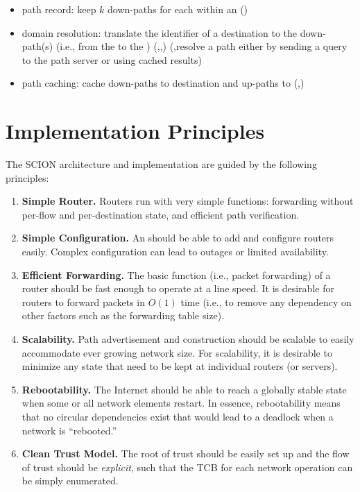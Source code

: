 \begin{itemize}
\item path record: keep $k$ down-paths for each \AD within an \ISD (\TAD)
\item domain resolution: translate the identifier of a destination \AD to the down-path(s) (i.e., from the \ISDC to the \AD) (\CAD,\TAD,\EAD) (\TAD,\EAD resolve a path either by sending a query to the \ISDC path server or using cached results) 
\item path caching: cache down-paths to destination \ADs and up-paths to \ISDC (\TAD,\EAD)
\end{itemize}


\section{Implementation Principles}
The SCION architecture and implementation are guided by the following principles:

\begin{enumerate}
\item {\bf Simple Router. }
Routers run with very simple functions: forwarding without per-flow and per-destination state, and efficient path verification.


\item {\bf Simple Configuration. }
An \AD should be able to add and configure routers easily. Complex configuration
can lead to outages or limited availability.


\item {\bf Efficient Forwarding. }
The basic function (i.e., packet forwarding) of a router should be fast enough to operate at a line speed. It is desirable for routers to forward packets in $O(1)$ time (i.e., to remove any dependency on other factors such as the forwarding table size). 

\item {\bf Scalability. }
Path advertisement and construction should be scalable to easily accommodate ever growing network size. For scalability, it is desirable to minimize any state that need to be kept at individual routers (or servers).

\item {\bf Rebootability. } The Internet should be able to reach a globally
  stable state when some or all network elements restart. In essence,
  rebootability means that no circular dependencies exist that would lead to a
  deadlock when a network is ``rebooted.''

\item {\bf Clean Trust Model. } The root of trust should be easily set up and
  the flow of trust should be {\em explicit}, such that the TCB for each network
  operation can be simply enumerated.

\end{enumerate}

